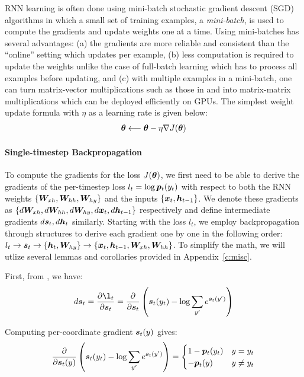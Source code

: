RNN learning is often done using mini-batch stochastic gradient descent (SGD) algorithms in
which a small set of training examples, a {\it mini-batch}, is used to compute
the gradients and update weights one at a time. Using mini-batches has
several advantages: (a) the gradients are more reliable and consistent than the
``online'' setting which updates per example, (b) less computation is required to
update the weights unlike the case of full-batch learning which has to process
all examples before updating, and (c) with multiple examples in a mini-batch,
one can turn matrix-vector multiplications such
as those in  and  into matrix-matrix multiplications which can be
deployed efficiently on GPUs. The simplest weight update formula with $\eta$ as
a learning rate is given below:
\begin{align}
\thetav \longleftarrow \thetav - \eta \grad{J(\thetav)} %
\end{align}

\paragraph{Single-timestep Backpropagation} To compute the gradients for the loss $J(\bm{\theta})$,
we first need to be able to derive the gradients of the per-timestep loss $l_t
=\log \bm{p}_{t}(y_t)$ with respect to both the RNN weights
$\{\bm{W}_{xh}, \bm{W}_{hh}, \bm{W}_{hy}\}$ and the inputs $\{\bm{x}_{t}, \bm{h}_{t-1}\}$. We denote
these gradients as $\{d\bm{W}_{xh}, d\bm{W}_{hh}, d\bm{W}_{hy}, d\bm{x}_{t}, d\bm{h}_{t-1}\}$
respectively and define intermediate gradients $d\bm{s}_{t}, d\bm{h}_{t}$ similarly. 
Starting with the loss $l_t$, we employ backpropagation through structures
\cite{goller:ieeenn00} to derive each gradient one by one in the following
order: $l_t \rightarrow \bm{s}_{t} \rightarrow \{\bm{h}_{t}, \bm{W}_{hy}\} \rightarrow
\{\bm{x}_{t}, \bm{h}_{t-1}, \bm{W}_{xh}, \bm{W}_{hh}\}$. To simplify the math, we will utlize
several lemmas and corollaries provided in Appendix~\ref{c:misc}.

First, from , we have:
\begin{align}
d\s{t} = \fracder{\l_t}{\s{t}} = \parfrac{\s{t}} \paren{\s{t}(y_t) - \log \sum_{y'}
e^{\s{t}(y')}}
\end{align}

Computing per-coordinate gradient $\bm{s}_{t}(y)$ gives:
\begin{align}
 \frac{\partial}{\partial \bm{s}_{t}(y)} \left(\bm{s}_{t}(y_t) - \log \sum_{y'} e^{\bm{s}_{t}(y')}\right) =
  \begin{cases}
   1 - \bm{p}_{t}(y_t) & y = y_t \\
   -\bm{p}_{t}(y) & y \neq y_t
  \end{cases}
\end{align}

